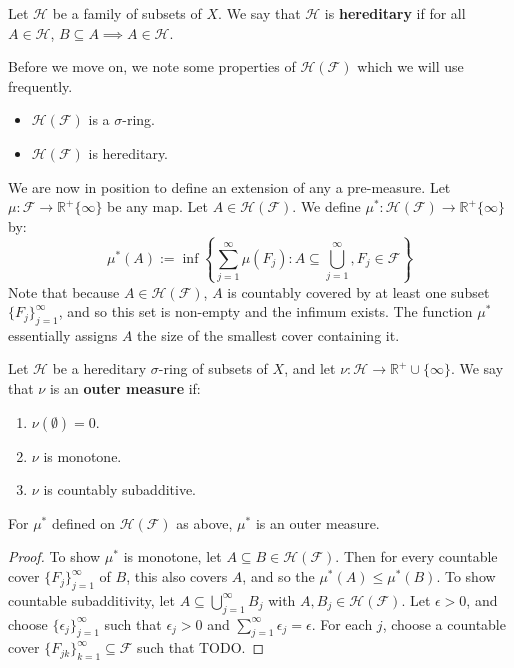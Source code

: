 	\begin{definition}[Hereditary]
		Let $\mathcal H$ be a family of subsets of $X$. We say that $\mathcal H$ is \textbf{hereditary} if for all $A\in\mathcal 
		H$, $B\subseteq A\implies A\in\mathcal H$.
	\end{definition}
	
	Before we move on, we note some properties of $\mathcal H(\mathcal F)$ which we will use frequently. 
	
	\begin{itemize}
		\item $\mathcal H(\mathcal F)$ is a $\sigma$-ring.
		\item $\mathcal H(\mathcal F)$ is hereditary.
	\end{itemize}
	
	We are now in position to define an extension of any a pre-measure. Let $\mu : \mathcal F\rightarrow\mathbb 
	R^+\{\infty\}$ be any map. Let $A\in\mathcal H(\mathcal F)$. We define $\mu^* : \mathcal H(\mathcal F)\rightarrow
	\mathbb R^+\{\infty\}$ by:
	$$
		\mu^*(A) := \inf \left\{\sum_{j = 1}^\infty\mu(F_j) : A\subseteq\bigcup_{j = 1}^\infty, F_j\in\mathcal F \right\}
	$$
	Note that because $A\in\mathcal H(\mathcal F)$, $A$ is countably covered by at least one subset $\{F_j\}_{j = 1}^\infty$, 
	and so this set is non-empty and the infimum exists. The function $\mu^*$ essentially assigns $A$ the size of the smallest 
	cover containing it. 
	
	\begin{definition}
		Let $\mathcal H$ be a hereditary $\sigma$-ring of subsets of $X$, and let $\nu : \mathcal H\rightarrow\mathbb R^+
		\cup\{\infty\}$. We say that $\nu$ is an \textbf{outer measure} if:
		\begin{enumerate}
			\item $\nu(\emptyset) = 0$.
			\item $\nu$ is monotone.
			\item $\nu$ is countably subadditive.
		\end{enumerate}
	\end{definition}
	
	\begin{theorem}
		For $\mu^*$ defined on $\mathcal H(\mathcal F)$ as above, $\mu^*$ is an outer measure.
	\end{theorem}
	
	\begin{proof}
		To show $\mu^*$ is monotone, let $A\subseteq B\in\mathcal H(\mathcal F)$. Then for every countable cover 
		$\{F_j\}_{j = 1}^\infty$ of $B$, this also covers $A$, and so the $\mu^*(A)\leq\mu^*(B)$. To show countable 
		subadditivity, let $A\subseteq\bigcup_{j = 1}^\infty B_j$ with $A, B_j\in\mathcal H(\mathcal F)$. Let $\epsilon > 0$, 
		and choose $\{\epsilon_j\}_{j = 1}^\infty$ such that $\epsilon_j > 0$ and $\sum_{j = 1}^\infty\epsilon_j = \epsilon$. For 
		each $j$, choose a countable cover $\{F_{jk}\}_{k = 1}^\infty\subseteq\mathcal F$ such that TODO.
	\end{proof}
	
